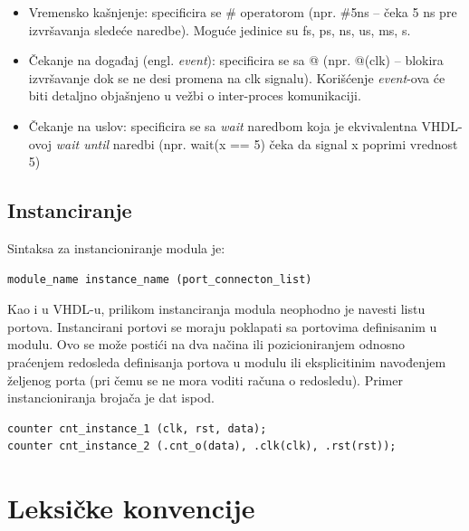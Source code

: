 \begin{itemize}
\item Vremensko kašnjenje:
  specificira se \(\#\) operatorom (npr. \(\#\)5ns – čeka 5 ns pre izvršavanja
  sledeće naredbe). Moguće jedinice su fs, ps, ns, us, ms, s.
\item Čekanje na događaj (engl. \emph{event}):
  specificira se sa @ (npr. @(clk) – blokira izvršavanje dok se ne desi promena
  na clk signalu). Korišćenje \emph{event}-ova će biti detaljno objašnjeno u
  vežbi o inter-proces komunikaciji.
\item Čekanje na uslov:
  specificira se sa \emph{wait} naredbom koja je ekvivalentna VHDL-ovoj
  \emph{wait until} naredbi (npr. wait(x == 5) čeka da signal x poprimi vrednost
  5)
\end{itemize}


\subsection{Instanciranje}

Sintaksa za instancioniranje modula je:

\begin{lstlisting}
module_name instance_name (port_connecton_list)
\end{lstlisting}

Kao i u VHDL-u, prilikom instanciranja modula neophodno je navesti listu
portova.
Instancirani portovi se moraju poklapati sa portovima definisanim u modulu.
Ovo se može postići na dva načina ili pozicioniranjem odnosno praćenjem
redosleda definisanja portova u modulu ili eksplicitinim navođenjem željenog
porta (pri čemu se ne mora voditi računa o redosledu).
Primer instancioniranja brojača je dat ispod.

\begin{lstlisting}
counter cnt_instance_1 (clk, rst, data);
counter cnt_instance_2 (.cnt_o(data), .clk(clk), .rst(rst));
\end{lstlisting}


\section{Leksičke konvencije}

